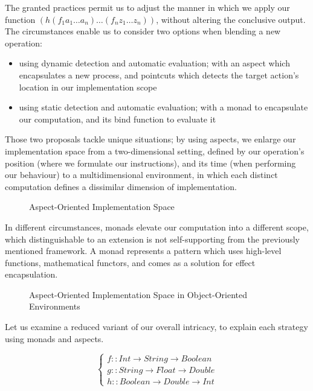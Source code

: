 The granted practices permit us to adjust the manner in which we apply our function $(h (f_1 a_1 \dots a_n) \dots (f_n z_1 \dots z_n))$, without altering the conclusive output. The circumstances enable us to consider two options when blending a new operation:

\begin{itemize}
    \item using dynamic detection and automatic evaluation; with an aspect which encapsulates a new process, and pointcuts which detects the target action's location in our implementation scope
    \item using static detection and automatic evaluation; with a monad to encapsulate our computation, and its bind function to evaluate it
\end{itemize}

Those two proposals tackle unique situations; by using aspects, we enlarge our implementation space from a two-dimensional setting, defined by our operation's position (where we formulate our instructions), and its time (when performing our behaviour) to a multidimensional environment, in which each distinct computation defines a dissimilar dimension of implementation. 

\begin{figure}
    \centering
    
    \caption{Aspect-Oriented Implementation Space}
    \label{fig::dimensions::aop}
\end{figure}

In different circumstances, monads elevate our computation into a different scope, which distinguishable to an extension is not self-supporting from the previously mentioned framework. A monad represents a pattern which uses high-level functions, mathematical functors, and comes as a solution for effect encapsulation.

\begin{figure}
    \centering
    
    \caption{Aspect-Oriented Implementation Space in Object-Oriented Environments}
    \label{fig::dimensions::oop}
\end{figure}

Let us examine a reduced variant of our overall intricacy, to explain each strategy using monads and aspects.

\begin{equation}
\begin{cases}
f:: Int \rightarrow String \rightarrow Boolean \\
g :: String \rightarrow Float \rightarrow Double \\
h :: Boolean \rightarrow Double \rightarrow Int
\end{cases}
\end{equation}

